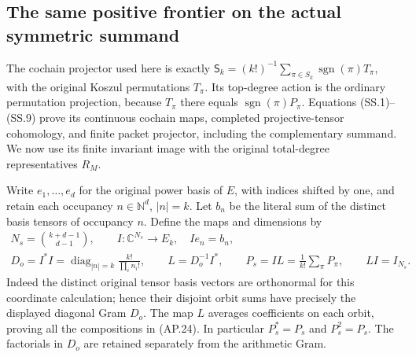 \subsection{The same positive frontier on the actual symmetric summand}

The cochain projector used here is exactly
\(\mathsf S_k=(k!)^{-1}\sum_{\pi\in S_k}
\operatorname{sgn}(\pi)T_\pi\), with the original Koszul
permutations \(T_\pi\).  Its top-degree action is the ordinary
permutation projection, because \(T_\pi\) there equals
\(\operatorname{sgn}(\pi)P_\pi\).  Equations
(SS.1)--(SS.9) prove its continuous cochain maps, completed
projective-tensor cohomology, and finite packet projector, including
the complementary summand.  We now use its finite invariant image
with the original total-degree representatives \(R_M\).

Write \(e_1,\ldots,e_d\) for the original power basis of
\(E\), with indices shifted by one, and retain each occupancy
\(n\in\mathbb N^d\), \(|n|=k\).  Let \(b_n\) be
the literal sum of the distinct basis tensors of occupancy \(n\).
Define the maps and dimensions by
\[
 \begin{gathered}
 N_s=\binom{k+d-1}{d-1},\qquad
 I:\mathbb C^{N_s}\longrightarrow E_k,\quad Ie_n=b_n,\\
 D_o=I^*I=\operatorname{diag}_{|n|=k}
                  \frac{k!}{\prod_i n_i!},\qquad
 L=D_o^{-1}I^*,\qquad P_s=IL=\frac1{k!}\sum_\pi P_\pi,
 \qquad LI=I_{N_s}.
 \end{gathered}                                                \tag{AP.24}
\]
Indeed the distinct original tensor basis vectors are orthonormal
for this coordinate calculation; hence their disjoint orbit sums
have precisely the displayed diagonal Gram \(D_o\).
The map \(L\) averages coefficients on each orbit, proving all
the compositions in (AP.24).  In particular \(P_s^*=P_s\)
and \(P_s^2=P_s\).  The factorials in \(D_o\) are
retained separately from the arithmetic Gram.

